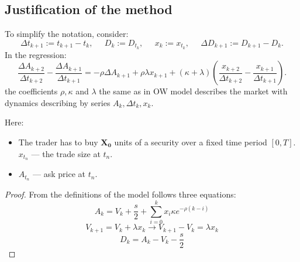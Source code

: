 \begin{appendices} %



	\section{Justification of the method}
        
        \begin{theorem}
                To simplify the notation, consider:
        \[ \Delta t_{k+1} := t_{k+1} - t_k, \; \; \; \; \; D_k := D_{t_k}, \; \; \; \; \; x_{k}:= x_{t_k}, \; \; \; \; \; \Delta D_{k+1} := D_{k+1} - D_k . \]
                In the regression:                                                                                                                                                                                                                                                                                                                                                                                        
                \begin{equation*}
                    \frac{\Delta A_{k+2}}{\Delta t_{k+2}} - \frac{\Delta A_{k+1}}{\Delta t_{k+1}} 
                = - \rho \Delta A_{k+1} + \rho \lambda x_{k+1} + (\kappa + \lambda) (\frac{x_{k+2}}{\Delta t_{k+2}} - \frac{x_{k+1}}{\Delta t_{k+1}}).
                \end{equation*}
                the coefficients $\rho, \kappa$ and $\lambda$ the same as in OW model describes the market with dynamics
                describing by series $A_k, \Delta t _k, x_k$.
        
        Here:
        \begin{itemize}
         \item The trader has to buy $\mathbf{X_0}$ units of a security over a ﬁxed time period $[0,T]$. $x_{t_n}$ 
         --- the trade size at $t_n$.
         \item $A_{t_n}$ --- ask price at $t_n$. 
        \end{itemize}

\end{theorem}
\begin{proof}
        From the definitions of the model follows three equations:
        \begin{equation} \label{rp1}
                A_k = V_k + \frac{s}{2} + \sum _{i=0} ^k x_i \kappa e^{- \rho (k - i)}
        \end{equation}
        \begin{equation}\label{rp2}
                V_{k+1} = V_k + \lambda x_k \rightarrow V_{k+1} - V_k = \lambda x_{k}
        \end{equation}
        \begin{equation} \label{rp3}
                D_k = A_k - V_k - \frac{s}{2}
        \end{equation}


\end{proof}
\end{appendices}
